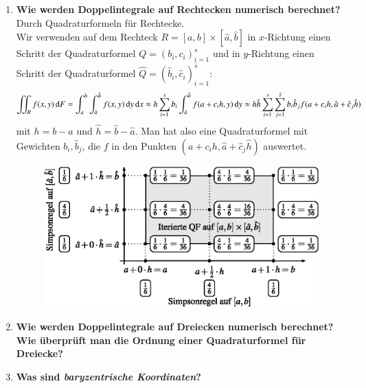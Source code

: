 \begin{enumerate}
		\pagebreak
		\item \textbf{Wie werden Doppelintegrale auf Rechtecken numerisch berechnet?} \\
			Durch Quadraturformeln für Rechtecke. \\
			Wir verwenden auf dem Rechteck \(R=[a,b]\times[\hat{a},\hat{b}]\) in \(x\)-Richtung einen Schritt der Quadraturformel \(Q=(b_i,c_i)^s_{i=1}\) und in \(y\)-Richtung einen Schritt der Quadraturformel \(\hat{Q}=(\hat{b}_i,\hat{c}_i)^{\hat{s}}_{i=1}\):
			\begin{align*}
				\iint_Rf(x,y)\dif{F}=\int_{a}^{b}\int_{\hat{a}}^{\hat{b}}f(x,y)\dif{y}\dif{x}\approx h\sum_{i=1}^{s}b_i\int_{\hat{a}}^{\hat{b}}f(a+c_ih,y)\dif{y}\approx h\hat{h}\sum_{i=1}^{s}\sum_{j=	1}^{\hat{s}}b_i\hat{b}_jf(a+c_ih,\hat{a}+\hat{c}_j\hat{h})
			\end{align*}
			mit \(h=b-a\) und \(\hat{h}=\hat{b}-\hat{a}\). Man hat also eine Quadraturformel mit Gewichten \(b_i,\hat{b}_j\), die \(f\) in den Punkten \((a+c_ih,\hat{a}+\hat{c}_j\hat{h})\) auswertet.
			\begin{figure}[htbp]
				\centering
				\includegraphics[width=0.7\linewidth]{kap4_3}
			\end{figure}
		
		\item \textbf{Wie werden Doppelintegrale auf Dreiecken numerisch berechnet? Wie überprüft man die Ordnung einer Quadraturformel für Dreiecke?} \\
		
		\item \textbf{Was sind \textit{baryzentrische Koordinaten}?} \\
		
	\end{enumerate}